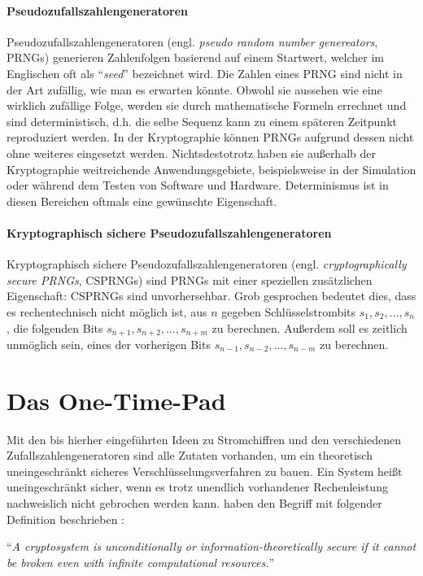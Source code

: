 \paragraph{Pseudozufallszahlengeneratoren}
Pseudozufallszahlengeneratoren (engl. \textit{pseudo random number genereators}, PRNGs)
generieren Zahlenfolgen basierend auf einem Startwert, welcher im Englischen oft als
\enquote{\textit{seed}} bezeichnet wird. Die Zahlen eines PRNG sind nicht in der Art zufällig, wie man
es erwarten könnte. Obwohl sie aussehen wie eine wirklich zufällige Folge, werden sie durch
mathematische Formeln errechnet und sind deterministisch, d.h. die selbe Sequenz
kann zu einem späteren Zeitpunkt reproduziert werden.
In der Kryptographie können PRNGs aufgrund dessen nicht ohne weiteres eingesetzt werden.
Nichtsdestotrotz haben sie außerhalb der Kryptographie weitreichende Anwendungsgebiete,
beispielsweise in der Simulation oder während dem Testen von Software und Hardware.
Determinismus ist in diesen Bereichen oftmals eine gewünschte Eigenschaft.

\paragraph{Kryptographisch sichere Pseudozufallszahlengeneratoren}
Kryptographisch sichere Pseudozufallszahlengeneratoren
(engl. \textit{cryptographically secure PRNGs}, CSPRNGs) sind PRNGs mit
einer speziellen zusätzlichen Eigenschaft: CSPRNGs sind unvorhersehbar. Grob gesprochen
bedeutet dies, dass es rechentechnisch nicht möglich ist, aus $n$ gegeben Schlüsselstrombits
$s_1,s_2,\dots,s_n$, die folgenden Bits $s_{n+1},s_{n+2},\dots,s_{n+m}$ zu berechnen. Außerdem
soll es zeitlich unmöglich sein, eines der vorherigen Bits $s_{n-1},s_{n-2},\dots,s_{n-m}$ zu
berechnen.

\section{Das One-Time-Pad}
Mit den bis hierher eingeführten Ideen zu Stromchiffren und den verschiedenen
Zufallszahlengeneratoren sind alle Zutaten vorhanden, um ein theoretisch uneingeschränkt
sicheres Verschlüsselungsverfahren zu bauen. Ein System heißt uneingeschränkt sicher,
wenn es trotz unendlich vorhandener Rechenleistung nachweislich nicht gebrochen werden kann.
\citeauthor{BOOK:crypto} haben den Begriff mit folgender Definition
beschrieben \parencite*[36]{BOOK:crypto}:

\begin{definition}
  \enquote{\textit{A cryptosystem is unconditionally or in\-formation-theoretically
      secure if it cannot be broken even with infinite computational resources.}}
\end{definition}

